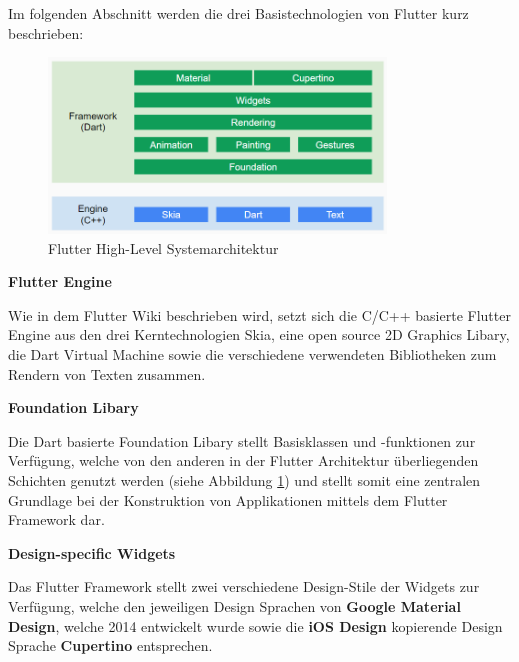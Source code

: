\documentclass[bibliography=totoc,listof=totoc,BCOR=5mm,DIV=12,oneside]{scrbook}
\begin{document}
\par \medskip Im folgenden Abschnitt werden die drei Basistechnologien von Flutter kurz beschrieben:

\begin{figure}[H]
	\centering
	\includegraphics[width=0.8\textwidth, keepaspectratio]{Bilder/highLevelOverview.png}
	\caption{Flutter High-Level Systemarchitektur \cite{Flu5}}
	\label{img:flutterHighLevelSystemOverview}
\end{figure}

\newpage
\par \bigskip \textbf{Flutter Engine}
\par Wie in dem Flutter Wiki \citep{Flu4} beschrieben wird, setzt sich die C/C++ basierte Flutter Engine aus den drei Kerntechnologien Skia\citep{Skia1}, eine open source 2D Graphics Libary, die Dart Virtual Machine sowie die verschiedene verwendeten Bibliotheken zum Rendern von Texten zusammen.

\par \bigskip \textbf{Foundation Libary}
\par Die Dart basierte Foundation Libary\citep{FoundationLibary} stellt Basisklassen und -funktionen zur Verfügung, welche von den anderen in der Flutter Architektur überliegenden Schichten genutzt werden (siehe Abbildung \ref{img:flutterHighLevelSystemOverview}) und stellt somit eine zentralen Grundlage bei der Konstruktion von Applikationen mittels dem Flutter Framework dar.

\par \bigskip \textbf{Design-specific Widgets}
\par Das Flutter Framework stellt zwei verschiedene Design-Stile der Widgets zur Verfügung, welche den jeweiligen Design Sprachen von \textbf{Google Material Design}\citep{Mat1}, welche 2014 entwickelt wurde sowie die \textbf{iOS Design}\citep{iOSDesign} kopierende Design Sprache \textbf{Cupertino}\citep{Cup1} entsprechen.
\end{document}
